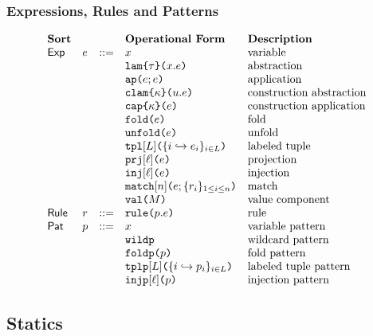 \subsubsection{Expressions, Rules and Patterns}
\[\begin{array}{lllllll}
\textbf{Sort} & & & \textbf{Operational Form} 
& \textbf{Description}\\
\mathsf{Exp} & e & ::= & x 
& \text{variable}\\
&&& \aelam{\tau}{x}{e} 
& \text{abstraction}\\
&&& \aeap{e}{e} 
& \text{application}\\
&&& \aeclam{\kappa}{u}{e} %
& \text{construction abstraction}\\
&&& \aecap{e}{\kappa} %
& \text{construction application}\\
&&& \aefold{e} %
& \text{fold}\\
&&& \aeunfold{e} %
& \text{unfold}\\
&&& \aetpl{\labelset}{\mapschema{e}{i}{\labelset}} 
& \text{labeled tuple}\\
&&& \aepr{\ell}{e} 
& \text{projection}\\
&&& \aein{\ell}{e} 
& \text{injection}\\
&&& \aematchwith{n}{e}{\seqschemaX{r}} 
& \text{match}\\
&&& \amval{M} 
& \text{value component}\\
\mathsf{Rule} & r & ::= & \aematchrule{p}{e} 
& \text{rule}\\
\mathsf{Pat} & p & ::= & x 
& \text{variable pattern}\\
&&& \aewildp 
& \text{wildcard pattern}\\
&&& \aefoldp{p} 
& \text{fold pattern}\\
&&& \aetplp{\labelset}{\mapschema{p}{i}{\labelset}} 
& \text{labeled tuple pattern}\\
&&& \aeinjp{\ell}{p} 
& \text{injection pattern}
\end{array}\]

\subsection{Statics}\label{appendix:P-statics}
